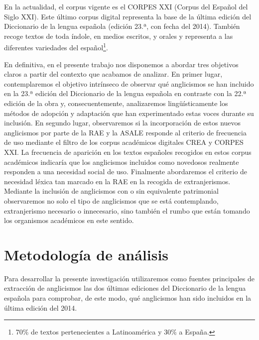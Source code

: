 \documentclass{textolivre}
\begin{document}
En la actualidad, el corpus vigente es el CORPES XXI (Corpus del Español del Siglo XXI).  Este último corpus digital representa la base de la última edición del Diccionario de la lengua española (edición 23.ª, con fecha del 2014). También recoge textos de toda índole, en medios escritos, y orales y representa a las diferentes variedades del español\footnote{
70\% de textos pertenecientes a Latinoamérica y 30\% a España.
}. 

En definitiva, en el presente trabajo nos disponemos a abordar tres objetivos claros a partir del contexto que acabamos de analizar. En primer lugar, contemplaremos el objetivo intrínseco de observar qué anglicismos se han incluido en la 23.ª edición del Diccionario de la lengua española \cite{real2014diccionario} en contraste con la 22.ª edición de la obra \cite{real2001diccionario} y, consecuentemente, analizaremos lingüísticamente los métodos de adopción y adaptación que han experimentado estas voces durante su inclusión. En segundo lugar, observaremos si la incorporación de estos nuevos anglicismos por parte de la RAE y la ASALE responde al criterio de frecuencia de uso mediante el filtro de los corpus académicos digitales CREA y CORPES XXI. La frecuencia de aparición en los textos españoles recogidos en estos corpus académicos indicaría que los anglicismos incluidos como novedosos realmente responden a una necesidad social de uso. Finalmente abordaremos el criterio de necesidad léxica tan marcado en la RAE en la recogida de extranjerismos. Mediante la inclusión de anglicismos con o sin equivalente patrimonial observaremos no solo el tipo de anglicismos que se está contemplando, extranjerismo necesario o innecesario, sino también el rumbo que están tomando los organismos académicos en este sentido.



\section{Metodología de análisis}\label{sec-metodologia}
Para desarrollar la presente investigación utilizaremos como fuentes principales de extracción de anglicismos las dos últimas ediciones del Diccionario de la lengua española para comprobar, de este modo, qué anglicismos han sido incluidos en la última edición del 2014.
\end{document}
